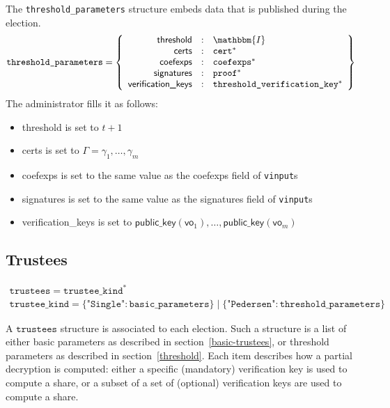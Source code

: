 \documentclass[a4paper]{article}
\newcommand{\I}{\mathbbm{I}}
\begin{document}
The \texttt{threshold\_parameters} structure embeds data that is
published during the election.
\begin{gather*}
  \texttt{threshold\_parameters}=\left\{
    \begin{array}{rcl}
      \textsf{threshold}&:&\I\\
      \textsf{certs}&:&\texttt{cert}^\ast\\
      \textsf{coefexps}&:&\texttt{coefexps}^\ast\\
      \textsf{signatures}&:&\proof^\ast\\
      \textsf{verification\_keys}&:&\texttt{threshold\_verification\_key}^\ast
    \end{array}
  \right\}
\end{gather*}
The administrator fills it as follows:
\begin{itemize}
\item \textsf{threshold} is set to $t+1$
\item \textsf{certs} is set to $\Gamma=\gamma_1,\dotsc,\gamma_m$
\item \textsf{coefexps} is set to the same value as the
  \textsf{coefexps} field of \texttt{vinput}s
\item \textsf{signatures} is set to the same value as the
  \textsf{signatures} field of \texttt{vinput}s
\item \textsf{verification\_keys} is set to
  $\textsf{public\_key}(\textsf{vo}_1),\dotsc,\textsf{public\_key}(\textsf{vo}_m)$
\end{itemize}

\subsection{Trustees}
\label{trustees}

\begin{gather*}
  \texttt{trustees}=\texttt{trustee\_kind}^\ast\\
  \texttt{trustee\_kind}=
  \{\texttt{"Single"}:\texttt{basic\_parameters}\}\mid
  \{\texttt{"Pedersen"}:\texttt{threshold\_parameters}\}
\end{gather*}

A $\texttt{trustees}$ structure is associated to each election. Such a
structure is a list of either basic parameters as described in
section~\ref{basic-trustees}, or threshold parameters as described in
section~\ref{threshold}.  Each item describes how a partial decryption
is computed: either a specific (mandatory) verification key is used to
compute a share, or a subset of a set of (optional) verification keys
are used to compute a share.
\end{document}
